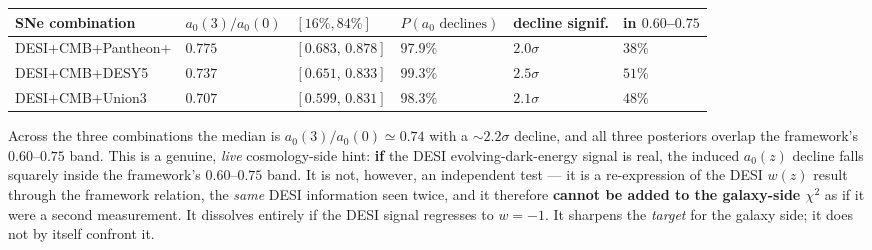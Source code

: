 \documentclass[
]{article}
\newcounter{none} %
\begin{document}
{\def\LTcaptype{none} %
\begin{longtable}[]{@{}
  >{\raggedright\arraybackslash}p{}
  >{\raggedright\arraybackslash}p{}
  >{\raggedright\arraybackslash}p{}
  >{\raggedright\arraybackslash}p{}
  >{\raggedright\arraybackslash}p{}
  >{\raggedright\arraybackslash}p{}@{}}
\toprule\noalign{}
\begin{minipage}[b]{\linewidth}\raggedright
SNe combination
\end{minipage} & \begin{minipage}[b]{\linewidth}\raggedright
\(a_0(3)/a_0(0)\)
\end{minipage} & \begin{minipage}[b]{\linewidth}\raggedright
\([16\%,84\%]\)
\end{minipage} & \begin{minipage}[b]{\linewidth}\raggedright
\(P(a_0\text{ declines})\)
\end{minipage} & \begin{minipage}[b]{\linewidth}\raggedright
decline signif.
\end{minipage} & \begin{minipage}[b]{\linewidth}\raggedright
in \(0.60\)--\(0.75\)
\end{minipage} \\
\midrule\noalign{}
\endhead
\bottomrule\noalign{}
\endlastfoot
DESI+CMB+Pantheon+ & \(0.775\) & \([0.683,\,0.878]\) & \(97.9\%\) &
\(2.0\sigma\) & \(38\%\) \\
DESI+CMB+DESY5 & \(0.737\) & \([0.651,\,0.833]\) & \(99.3\%\) &
\(2.5\sigma\) & \(51\%\) \\
DESI+CMB+Union3 & \(0.707\) & \([0.599,\,0.831]\) & \(98.3\%\) &
\(2.1\sigma\) & \(48\%\) \\
\end{longtable}
}

Across the three combinations the median is \(a_0(3)/a_0(0)\simeq0.74\)
with a \(\sim2.2\sigma\) decline, and all three posteriors overlap the
framework's \(0.60\)--\(0.75\) band. This is a genuine, \emph{live}
cosmology-side hint: \textbf{if} the DESI evolving-dark-energy signal is
real, the induced \(a_0(z)\) decline falls squarely inside the
framework's \(0.60\)--\(0.75\) band. It is not, however, an independent
test --- it is a re-expression of the DESI \(w(z)\) result through the
framework relation, the \emph{same} DESI information seen twice, and it
therefore \textbf{cannot be added to the galaxy-side \(\chi^2\)} as if
it were a second measurement. It dissolves entirely if the DESI signal
regresses to \(w=-1\). It sharpens the \emph{target} for the galaxy
side; it does not by itself confront it.
\end{document}
